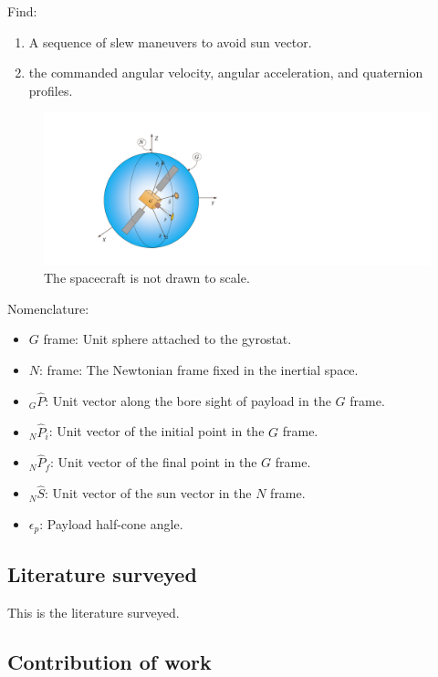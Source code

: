 \documentclass[letterpaper, preprint, paper,11pt]{AAS}	%
\begin{document}
	Find: 
	\begin{enumerate}
		\item A sequence of slew maneuvers to avoid sun vector.
		\item the commanded angular velocity, angular acceleration, and quaternion profiles.
	\end{enumerate} 
	\begin{figure}[htb]
		\begin{center}
			\includegraphics[width=6in]{./Figures/SAS_Schematic}
			\caption{The spacecraft is not drawn to scale.}
		\end{center}
	\end{figure}
	
	Nomenclature: 
	\begin{itemize}
		\item $G$ frame: Unit sphere attached to the gyrostat.
		\item $N$: frame: The Newtonian frame fixed in the inertial space.
		\item $_G\hat{P}$: Unit vector along the bore sight of payload in the $G$ frame.
		\item $_N\hat{P}_i$: Unit vector of the initial point in the $G$ frame.
		\item $_N\hat{P}_f$: Unit vector of the final point in the $G$ frame.
		\item $_N\hat{S}$: Unit vector of the sun vector in the $N$ frame.
		\item $\epsilon_p$: Payload half-cone angle.
	\end{itemize}
	
	\clearpage
	\subsection{Literature surveyed}
	
	This is the literature surveyed. 
	
	\subsection{Contribution of work} 
	
\end{document}
